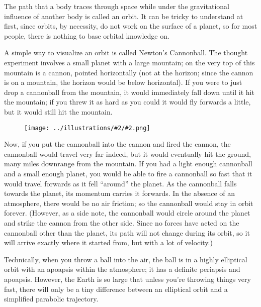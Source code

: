 \documentclass[oneside,a5paper]{book}
\newcommand{\widthillustration}[2]{{\centering\texttt{[image: ../illustrations/\#2/\#2.png]}}}
\begin{document}
The path that a body traces through space while under the
gravitational influence of another body is called an orbit. It can be
tricky to understand at first, since orbits, by necessity, do not work
on the surface of a planet, so for most people, there is nothing to
base orbital knowledge on.

A simple way to visualize an orbit is called Newton’s Cannonball. The
thought experiment involves a small planet with a large mountain; on
the very top of this mountain is a cannon, pointed horizontally (not
at the horizon; since the cannon is on a mountain, the horizon would
be below horizontal). If you were to just drop a cannonball from the
mountain, it would immediately fall down until it hit the mountain; if
you threw it as hard as you could it would fly forwards a little, but
it would still hit the mountain.

\begin{figure}[!h]
  \begin{center}
    \widthillustration{0.5\linewidth}{newton-cannonball}
  \end{center}
\end{figure}

\vspace{-2em}

Now, if you put the cannonball into the cannon and fired the cannon,
the cannonball would travel very far indeed, but it would eventually
hit the ground, many miles downrange from the mountain. If you had a
light enough cannonball and a small enough planet, you would be able
to fire a cannonball so fast that it would travel forwards as it fell
``around'' the planet. As the cannonball falls towards the planet, its
momentum carries it forwards. In the absence of an atmosphere, there
would be no air friction; so the cannonball would stay in orbit
forever. (However, as a side note, the cannonball would circle around
the planet and strike the cannon from the other side. Since no forces
have acted on the cannonball other than the planet, its path will not
change during its orbit, so it will arrive exactly where it started
from, but with a lot of velocity.)

Technically, when you throw a ball into the air, the ball is in a
highly elliptical orbit with an apoapsis within the atmosphere; it has
a definite periapsis and apoapsis. However, the Earth is so large that
unless you’re throwing things very fast, there will only be a tiny
difference between an elliptical orbit and a simplified parabolic
trajectory.
\end{document}
